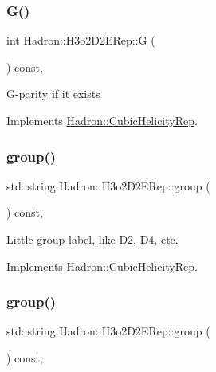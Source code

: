 \subsubsection{\texorpdfstring{G()}{G()}\hspace{0.1cm}{\footnotesize\ttfamily [3/3]}}
{\footnotesize\ttfamily int Hadron\+::\+H3o2\+D2\+E\+Rep\+::G (\begin{DoxyParamCaption}{ }\end{DoxyParamCaption}) const\hspace{0.3cm}{\ttfamily [inline]}, {\ttfamily [virtual]}}

G-\/parity if it exists 

Implements \mbox{\hyperlink{structHadron_1_1CubicHelicityRep_a50689f42be1e6170aa8cf6ad0597018b}{Hadron\+::\+Cubic\+Helicity\+Rep}}.

\mbox{\label{structHadron_1_1H3o2D2ERep_ad9d9eb7585ef277acd3efb48c5912c95}} 
\subsubsection{\texorpdfstring{group()}{group()}\hspace{0.1cm}{\footnotesize\ttfamily [1/5]}}
{\footnotesize\ttfamily std\+::string Hadron\+::\+H3o2\+D2\+E\+Rep\+::group (\begin{DoxyParamCaption}{ }\end{DoxyParamCaption}) const\hspace{0.3cm}{\ttfamily [inline]}, {\ttfamily [virtual]}}

Little-\/group label, like D2, D4, etc. 

Implements \mbox{\hyperlink{structHadron_1_1CubicHelicityRep_a101a7d76cd8ccdad0f272db44b766113}{Hadron\+::\+Cubic\+Helicity\+Rep}}.

\mbox{\label{structHadron_1_1H3o2D2ERep_ad9d9eb7585ef277acd3efb48c5912c95}} 
\subsubsection{\texorpdfstring{group()}{group()}\hspace{0.1cm}{\footnotesize\ttfamily [2/5]}}
{\footnotesize\ttfamily std\+::string Hadron\+::\+H3o2\+D2\+E\+Rep\+::group (\begin{DoxyParamCaption}{ }\end{DoxyParamCaption}) const\hspace{0.3cm}{\ttfamily [inline]}, {\ttfamily [virtual]}}

